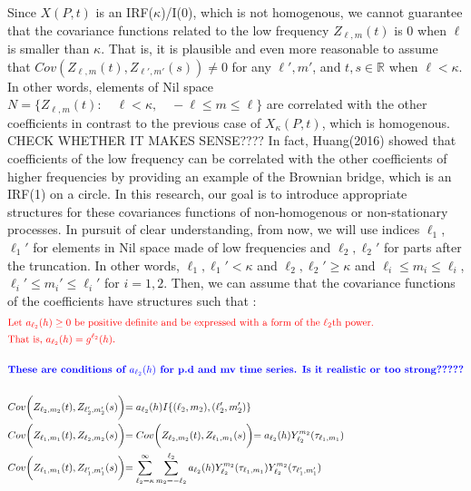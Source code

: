 \documentclass[11pt]{article}
\begin{document}
\begin{itemize}
{\begin{align*}
\end{align*}
}
\\
Since $X(P,t)$ is an IRF($\kappa$)/I(0), which is not homogenous, we cannot guarantee that the covariance functions related to the low frequency $Z_{\ell, m}(t)$ is 0 when $\ell$ is smaller than $\kappa$. That is, it is plausible and even more reasonable to assume that $Cov(Z_{\ell,m}(t), Z_{\ell',m'}(s)) \ne 0$ for any $\ell', m'$, and $t,s \in \mathbb{R}$ when $\ell<\kappa$. In other words, elements of Nil space $N=\{Z_{\ell,m}(t) : \quad \ell<\kappa, \quad -\ell \le m \le \ell\}$ are correlated with the other coefficients in contrast to the previous case of $X_\kappa(P,t)$, which is homogenous.{\color{red} CHECK WHETHER IT MAKES SENSE????} In fact, Huang(2016) showed that coefficients of the low frequency can be correlated with the other coefficients of higher frequencies by providing an example of the Brownian bridge, which is an IRF(1) on a circle. In this research, our goal is to introduce appropriate structures for these covariances functions of non-homogenous or non-stationary processes. In pursuit of clear understanding, from now, we will use indices $\ell_1$, $\ell_1'$ for elements in Nil space made of low frequencies and $\ell_2,\ell_2'$ for parts after the truncation. In other words, $\ell_1, \ell_1' < \kappa$ and $\ell_2, \ell _2' \ge \kappa$ and $\ell_i \le m_i \le \ell_i$, $\ell_i' \le m_i' \le \ell_i'$ for $i=1,2$. Then, we can assume that the covariance functions of the coefficients have structures such that :\\
\begin{align*}
&{\color{red}\text{Let $a_{\ell_2}(h) \ge 0$ be positive definite and be expressed with a form of the $\ell_2$th power.}}\\ 
&{\color{red}\text{That is, $a_{\ell_2}(h) = g^{\ell_2}(h)$.}}\\
\\
&{\color{blue}\textbf{\text{These are conditions of $a_{\ell_2}(h)$ for p.d and mv time series. Is it realistic or too strong?????}}}\\
\\
&Cov\biggl( Z_{\ell_2,m_2}(t), Z_{\ell_2',m_2'}(s) \biggl) = a_{\ell_2}(h) I\{(\ell_2,m_2),(\ell'_2,m_2')\}\\
&Cov\biggl( Z_{\ell_1,m_1}(t), Z_{\ell_2,m_2}(s) \biggl) = Cov\biggl( Z_{\ell_2,m_2}(t), Z_{\ell_1,m_1}(s) \biggl) = a_{\ell_2}(h) Y_{\ell_2}^{m_2}(\tau_{\ell_1,m_1})\\
&Cov\biggl( Z_{\ell_1,m_1}(t), Z_{\ell_1',m_1'}(s) \biggl) = \sum_{\ell_2=\kappa}^{\infty} \sum_{m_2=-\ell_2}^{\ell_2} a_{\ell_2}(h) Y_{\ell_2}^{m_2}(\tau_{\ell_1,m_1}) Y_{\ell_2}^{m_2}(\tau_{\ell_1',m_1'})\\

\end{align*}
\end{itemize}
\end{document}

